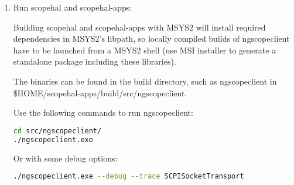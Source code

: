 \begin{enumerate}









\item Run scopehal and scopehal-apps:

Building scopehal and scopehal-apps with MSYS2 will install required dependencies in MSYS2's libpath, so locally
compiled builds of ngscopeclient have to be launched from a MSYS2 shell (use MSI installer to generate a standalone
package including these libraries).

The binaries can be found in the build directory, such as ngscopeclient in \$HOME/scopehal-apps/build/src/ngscopeclient.

Use the following commands to run ngscopeclient:
\begin{lstlisting}[language=sh, numbers=none]
cd src/ngscopeclient/
./ngscopeclient.exe
\end{lstlisting}

Or with some debug options:
\begin{lstlisting}[language=sh, numbers=none]
./ngscopeclient.exe --debug --trace SCPISocketTransport
\end{lstlisting}



\end{enumerate}

